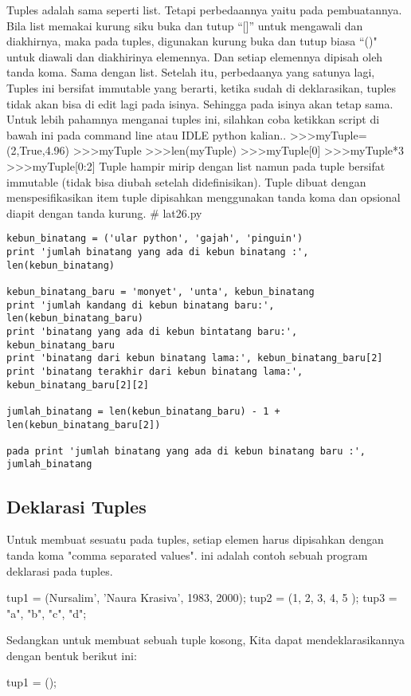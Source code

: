 Tuples adalah sama seperti list. Tetapi perbedaannya yaitu pada pembuatannya. Bila list memakai kurung siku buka dan tutup “[]” untuk mengawali dan diakhirnya, maka pada tuples, digunakan kurung buka dan tutup biasa “()" untuk diawali dan diakhirinya elemennya. Dan setiap elemennya dipisah oleh tanda koma. Sama dengan list. Setelah itu, perbedaanya yang satunya lagi, Tuples ini bersifat immutable yang berarti, ketika sudah di deklarasikan, tuples tidak akan bisa di edit lagi pada isinya. Sehingga pada isinya akan tetap sama. Untuk lebih pahamnya menganai tuples ini, silahkan coba ketikkan script di bawah ini pada command line atau IDLE python kalian..
>>>myTuple=(2,True,4.96) 
>>>myTuple 
>>>len(myTuple) 
>>>myTuple[0] 
>>>myTuple*3
 >>>myTuple[0:2]
Tuple hampir mirip dengan list namun pada tuple bersifat immutable (tidak bisa diubah setelah didefinisikan).
Tuple dibuat dengan menspesifikasikan item tuple dipisahkan menggunakan tanda koma dan opsional diapit dengan tanda kurung.
\# lat26.py
\begin{verbatim}
kebun_binatang = ('ular python', 'gajah', 'pinguin')
print 'jumlah binatang yang ada di kebun binatang :', len(kebun_binatang)

kebun_binatang_baru = 'monyet', 'unta', kebun_binatang
print 'jumlah kandang di kebun binatang baru:', len(kebun_binatang_baru)
print 'binatang yang ada di kebun bintatang baru:', kebun_binatang_baru
print 'binatang dari kebun binatang lama:', kebun_binatang_baru[2]
print 'binatang terakhir dari kebun binatang lama:', kebun_binatang_baru[2][2]

jumlah_binatang = len(kebun_binatang_baru) - 1 + len(kebun_binatang_baru[2])

pada print 'jumlah binatang yang ada di kebun binatang baru :', jumlah_binatang
\end{verbatim}
\subsection {Deklarasi Tuples}


Untuk membuat sesuatu pada tuples, setiap elemen harus dipisahkan dengan tanda koma "comma separated values". ini adalah contoh sebuah program deklarasi pada tuples.

tup1 = (Nursalim', 'Naura Krasiva', 1983, 2000);
tup2 = (1, 2, 3, 4, 5 );
tup3 = "a", "b", "c", "d";

Sedangkan untuk membuat sebuah tuple kosong, Kita dapat mendeklarasikannya dengan bentuk berikut ini:

tup1 = ();

